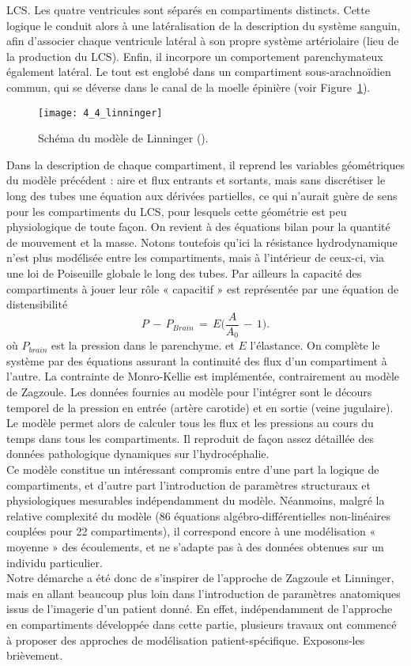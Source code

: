 LCS. Les quatre ventricules sont séparés en compartiments distincts. Cette logique le conduit alors à
une latéralisation de la description du système sanguin, afin d'associer chaque ventricule latéral à son
propre système artériolaire (lieu de la production du LCS). Enfin, il incorpore un comportement
parenchymateux également latéral. Le tout est englobé dans un compartiment sous-arachnoïdien
commun, qui se déverse dans le canal de la moelle épinière (voir Figure~\ref{fig:4_4_linninger}). 
\begin{figure}[!t]
\centering
\texttt{[image: 4\_4\_linninger]}
\caption{Schéma du modèle de Linninger (\cite{Linninger2009}).}
\label{fig:4_4_linninger}	
\end{figure}
Dans la description de
chaque compartiment, il reprend les variables géométriques du modèle précédent : aire et flux
entrants et sortants, mais sans discrétiser le long des tubes une équation aux dérivées partielles, ce
qui n'aurait guère de sens pour les compartiments du LCS, pour lesquels cette géométrie est peu
physiologique de toute façon. On revient à des équations bilan pour la quantité de mouvement et la
masse. Notons toutefois qu'ici la résistance hydrodynamique n'est plus modélisée entre les
compartiments, mais à l'intérieur de ceux-ci, via une loi de Poiseuille globale le long des tubes. Par
ailleurs la capacité des compartiments à jouer leur rôle « capacitif » est représentée par une équation
de distensibilité
\begin{equation}
P\,-\,P_{Brain}\,=\,E\biggl(\frac{A}{A_0}\,-\,1\biggr).
\end{equation}
où $P_{brain}$ est la pression dans le parenchyme. et $E$ l'élastance. On complète le système par des équations assurant la continuité des flux d'un compartiment à
l'autre. La contrainte de Monro-Kellie est implémentée, contrairement au modèle de Zagzoule. Les
données fournies au modèle pour l'intégrer sont le décours temporel de la pression en entrée (artère
carotide) et en sortie (veine jugulaire). Le modèle permet alors de calculer tous les flux et les pressions
au cours du temps dans tous les compartiments. Il reproduit de façon assez détaillée des données
pathologique dynamiques sur l'hydrocéphalie.\\
Ce modèle constitue un intéressant compromis entre d'une part la logique de compartiments,
et d'autre part l'introduction de paramètres structuraux et physiologiques mesurables
indépendamment du modèle. Néanmoins, malgré la relative complexité du modèle (86 équations
algébro-différentielles non-linéaires couplées pour 22 compartiments), il correspond encore à une
modélisation « moyenne » des écoulements, et ne s'adapte pas à des données obtenues sur un
individu particulier.\\
Notre démarche a été donc de s'inspirer de l'approche de Zagzoule et Linninger, mais en allant
beaucoup plus loin dans l'introduction de paramètres anatomiques issus de l'imagerie d'un patient
donné. En effet, indépendamment de l'approche en compartiments développée dans cette partie,
plusieurs travaux ont commencé à proposer des approches de modélisation patient-spécifique.
Exposons-les brièvement.
